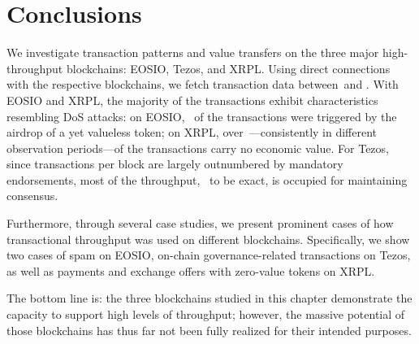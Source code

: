 \section{Conclusions}
\label{sec:4:conclusion}

We investigate transaction patterns and value transfers on the three major high-throughput blockchains: EOSIO, Tezos, and XRPL.
Using direct connections with the respective blockchains, we fetch transaction data between~\startdate and \finishdate.
With EOSIO and XRPL, the majority of the transactions exhibit characteristics resembling DoS attacks: on EOSIO,~ of the transactions were triggered by the airdrop of a yet valueless token; on XRPL, over~---consistently in different observation periods---of the transactions carry no economic value.
For Tezos, since transactions per block are largely outnumbered by mandatory endorsements, most of the throughput,~ to be exact, is occupied for maintaining consensus.

Furthermore, through several case studies, we present prominent cases of how transactional throughput was used on different blockchains.
Specifically, we show two cases of spam on EOSIO, on-chain governance-related transactions on Tezos, as well as payments and exchange offers with zero-value tokens on XRPL.

The bottom line is: the three blockchains studied in this chapter demonstrate the capacity to support high levels of throughput; however, the massive potential of those blockchains has thus far not been fully realized for their intended purposes.
